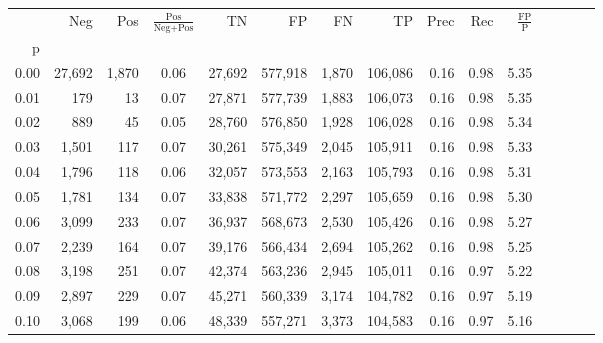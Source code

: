 \begin{tabular}{rrrcrrrrrrrrrrr}
\toprule
{} &     Neg &    Pos & $\frac{\text{Pos}}{\text{Neg}+\text{Pos}}$ &       TN &       FP &       FN &       TP &  Prec &   Rec & $\frac{\text{FP}}{\text{P}}$ \\
p    &         &        &                                            &          &          &          &          &       &       &                              \\
\midrule
0.00 &  27,692 &  1,870 &                                       0.06 &   27,692 &  577,918 &    1,870 &  106,086 &  0.16 &  0.98 &                         5.35 \\
0.01 &     179 &     13 &                                       0.07 &   27,871 &  577,739 &    1,883 &  106,073 &  0.16 &  0.98 &                         5.35 \\
0.02 &     889 &     45 &                                       0.05 &   28,760 &  576,850 &    1,928 &  106,028 &  0.16 &  0.98 &                         5.34 \\
0.03 &   1,501 &    117 &                                       0.07 &   30,261 &  575,349 &    2,045 &  105,911 &  0.16 &  0.98 &                         5.33 \\
0.04 &   1,796 &    118 &                                       0.06 &   32,057 &  573,553 &    2,163 &  105,793 &  0.16 &  0.98 &                         5.31 \\
0.05 &   1,781 &    134 &                                       0.07 &   33,838 &  571,772 &    2,297 &  105,659 &  0.16 &  0.98 &                         5.30 \\
0.06 &   3,099 &    233 &                                       0.07 &   36,937 &  568,673 &    2,530 &  105,426 &  0.16 &  0.98 &                         5.27 \\
0.07 &   2,239 &    164 &                                       0.07 &   39,176 &  566,434 &    2,694 &  105,262 &  0.16 &  0.98 &                         5.25 \\
0.08 &   3,198 &    251 &                                       0.07 &   42,374 &  563,236 &    2,945 &  105,011 &  0.16 &  0.97 &                         5.22 \\
0.09 &   2,897 &    229 &                                       0.07 &   45,271 &  560,339 &    3,174 &  104,782 &  0.16 &  0.97 &                         5.19 \\
0.10 &   3,068 &    199 &                                       0.06 &   48,339 &  557,271 &    3,373 &  104,583 &  0.16 &  0.97 &                         5.16 \\

\end{tabular}
